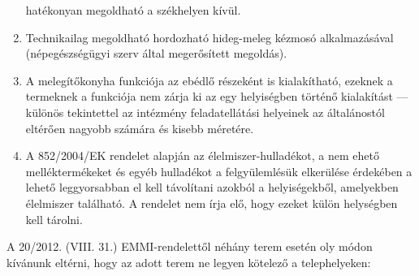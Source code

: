 \begin{enumerate}
  hatékonyan megoldható a székhelyen kívül.
\item
  Technikailag megoldható hordozható hideg-meleg kézmosó alkalmazásával
  (népegészségügyi szerv által megerősített megoldás).
\item
  A melegítőkonyha funkciója az ebédlő részeként is
 kialakítható,\break
 ezeknek
  a termeknek a funkciója nem zárja ki az egy helyiségben történő kialakítást ---
  különös tekintettel az intézmény feladatellátási helyeinek
  az általánostól eltérően nagyobb számára és kisebb méretére.
\item
  A 852/2004/EK rendelet alapján az élelmiszer-hulladékot, a nem ehető
  melléktermékeket és egyéb hulladékot a felgyülemlésük elkerülése
  érdekében a lehető leggyorsabban el kell távolítani azokból a
  helyiségekből, amelyekben élelmiszer található. A rendelet nem írja
  elő, hogy ezeket külön helységben kell tárolni.
\end{enumerate}

A 20/2012. (VIII. 31.) EMMI-rendelettől néhány terem esetén oly módon
kívánunk eltérni, hogy az adott terem ne legyen kötelező a
telephelyeken:

